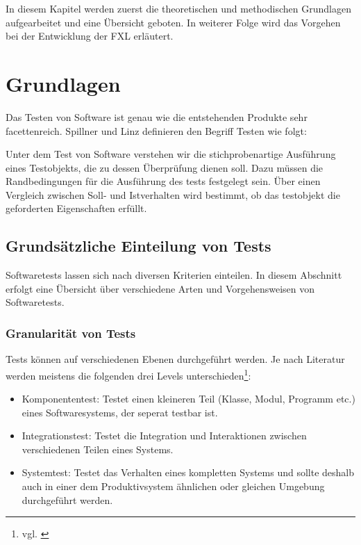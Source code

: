 In diesem Kapitel werden zuerst die theoretischen und methodischen Grundlagen aufgearbeitet und eine Übersicht geboten. In weiterer Folge wird das Vorgehen bei der Entwicklung der FXL erläutert.



\section{Grundlagen}

Das Testen von Software ist genau wie die entstehenden Produkte sehr facettenreich. Spillner und Linz definieren den Begriff Testen wie folgt:

\begin{myquote}
Unter dem Test von Software verstehen wir die stichprobenartige Aus\-führ\-ung eines Testobjekts, die zu dessen Überprüfung dienen soll. Dazu müssen die Randbedingungen für die Aus\-führ\-ung des tests festgelegt sein. Über einen Vergleich zwischen Soll- und Istverhalten wird bestimmt, ob das testobjekt die geforderten Eigenschaften erfüllt.\cite{SpLi10}
\end{myquote}

\subsection{Grundsätzliche Einteilung von Tests}

Softwaretests lassen sich nach diversen Kriterien einteilen. In diesem Abschnitt erfolgt eine Übersicht über verschiedene Arten und Vorgehensweisen von Softwaretests.

\subsubsection{Granularität von Tests}

Tests können auf verschiedenen Ebenen durchgeführt werden. Je nach Literatur werden meistens die folgenden drei Levels unterschieden\footnote{vgl. \cite{ISTQB1}}:

\begin{itemize}
  \item Komponententest: Testet einen kleineren Teil (Klasse, Modul, Programm etc.) eines Softwaresystems, der seperat testbar ist.
  \item Integrationstest: Testet die Integration und Interaktionen zwischen verschiedenen Teilen eines Systems.
  \item Systemtest: Testet das Verhalten eines kompletten Systems und sollte deshalb auch in einer dem Produktivsystem ähnlichen oder gleichen Umgebung durchgeführt werden.
\end{itemize}

